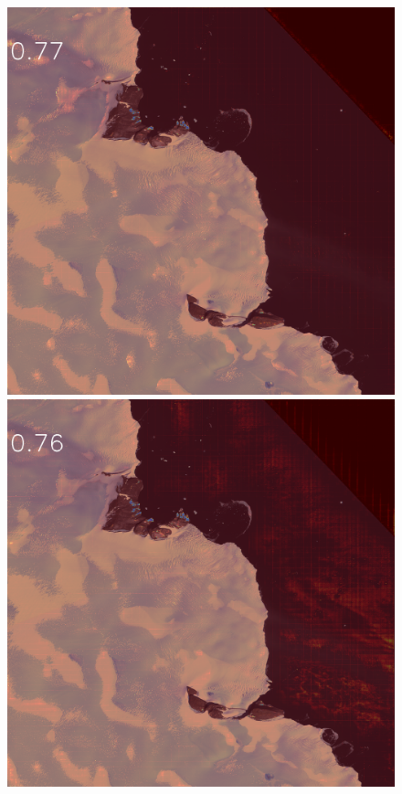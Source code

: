 \begin{figure}[h]
\includegraphics[width=\subFigx]{./fig/datagrow/MSE_single_unet_train_1_3.txt_bias-1_bs128_do0.1e25/0.png}
\includegraphics[width=\subFigx]{./fig/datagrow/MSE_single_unet_train_1_4.txt_bias-1_bs128_do0.1e25/0.png}



\end{figure}
